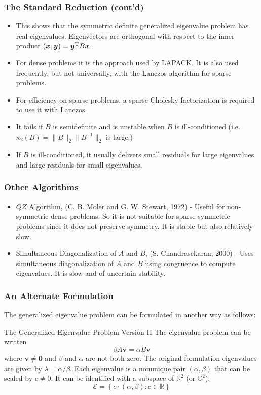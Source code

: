 \documentclass[landscape]{beamer}
\newcommand{\R}{{\mathbb R}}
\newcommand{\C}{{\mathbb C}}
\renewcommand{\vec}[1]{\bm{#1}}
\newcommand{\T}{{\rm T}}
\begin{document}
\begin{frame}
  \frametitle{The Standard Reduction (cont'd)}

  \begin{itemize}
  \item This shows that the symmetric definite generalized eigenvalue
    problem has real eigenvalues. Eigenvectors are orthogonal with
    respect to the inner product
    $(\vec{x}, \vec{y}) = \vec{y}^\T B \vec{x}$.
  \item For dense problems it is the approach used by LAPACK. It is also used frequently, but not universally, with the Lanczos algorithm for sparse problems.
  \item For efficiency on sparse problems, a sparse Cholesky
      factorization is required to use it with Lanczos.
  \item It fails if $B$ is semidefinite and is unstable when $B$ is
    ill-conditioned (i.e. $\kappa_2(B) = \|B\|_2\|B^{-1}\|_2$ is
    large.)
  \item If $B$ is ill-conditioned, it usually delivers small residuals for
    large eigenvalues and large residuals for small eigenvalues.
  \end{itemize}
\end{frame}
\begin{frame}
	\frametitle{Other Algorithms}
	\begin{itemize}
        \item $QZ$ Algorithm, (C. B. Moler and G. W. Stewart, 1972) - Useful for non-symmetric dense problems. So it is not suitable for sparse symmetric problems since it does not preserve symmetry. It is stable but also relatively slow.
		
        \item Simultaneous Diagonalization of $A$ and $B$, (S. Chandrasekaran, 2000) - Uses simultaneous diagonalization of $A$ and $B$ using congruence to compute eigenvalues. It is slow and of uncertain stability.
	\end{itemize}
\end{frame}

\begin{frame}
  \frametitle{An Alternate Formulation} 

  The generalized eigenvalue problem can be formulated in another way as
  follows:

  \begin{block}{The Generalized Eigenvalue Problem Version II}
    The eigenvalue problem can be written
    \begin{equation*}
      \beta A \vec{v} = \alpha B \vec{v}
    \end{equation*}
    where $\vec{v} \neq \vec{0}$ and $\beta$ and $\alpha$ are not both
    zero.  The original formulation eigenvalues are given by
    $\lambda = \alpha/\beta$.  Each eigenvalue is a nonunique pair
    $(\alpha, \beta)$ that can be scaled by $c \neq 0$.  It
    can be identified with a subspace of $\R^2$ (or $\C^2$):
    \begin{equation*}
      \mathcal{E} = 
      \left\{ c\cdot (\alpha, \beta) : c \in \R \right\}
    \end{equation*}
  \end{block}
\end{frame}
\end{document}
